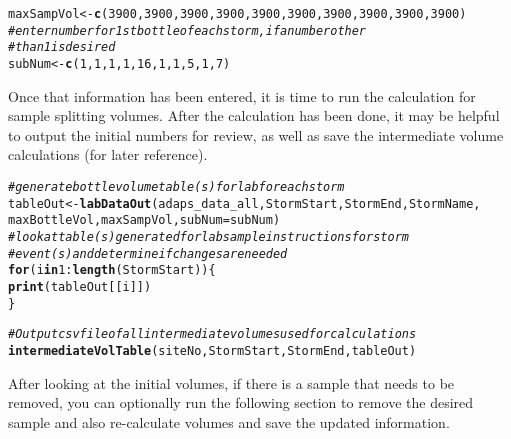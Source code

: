 \documentclass[a4paper,11pt]{article}\usepackage[]{graphicx}\usepackage[]{color}
\makeatletter
\newcommand{\hlnum}[1]{\textcolor[rgb]{0.686,0.059,0.569}{#1}}%
\newcommand{\hlcom}[1]{\textcolor[rgb]{0.678,0.584,0.686}{\textit{#1}}}%
\newcommand{\hlopt}[1]{\textcolor[rgb]{0,0,0}{#1}}%
\newcommand{\hlstd}[1]{\textcolor[rgb]{0.345,0.345,0.345}{#1}}%
\newcommand{\hlkwa}[1]{\textcolor[rgb]{0.161,0.373,0.58}{\textbf{#1}}}%
\newcommand{\hlkwb}[1]{\textcolor[rgb]{0.69,0.353,0.396}{#1}}%
\newcommand{\hlkwc}[1]{\textcolor[rgb]{0.333,0.667,0.333}{#1}}%
\newcommand{\hlkwd}[1]{\textcolor[rgb]{0.737,0.353,0.396}{\textbf{#1}}}%
\newenvironment{kframe}{%
 \def\at@end@of@kframe{}%
 \ifinner\ifhmode%
  \def\at@end@of@kframe{\end{minipage}}%
  \begin{minipage}{\columnwidth}%
 \fi\fi%
 \def\FrameCommand##1{\hskip\@totalleftmargin \hskip-\fboxsep
 \colorbox{shadecolor}{##1}\hskip-\fboxsep
     \hskip-\linewidth \hskip-\@totalleftmargin \hskip\columnwidth}%
 \MakeFramed {\advance\hsize-\width
   \@totalleftmargin\z@ \linewidth\hsize
   \@setminipage}}%
 {\par\unskip\endMakeFramed%
 \at@end@of@kframe}
\newenvironment{knitrout}{}{} %
\makeatother
\begin{document}
\begin{knitrout}
\begin{kframe}
\begin{alltt}
\hlstd{maxSampVol} \hlkwb{<-} \hlkwd{c}\hlstd{(}\hlnum{3900}\hlstd{,}\hlnum{3900}\hlstd{,}\hlnum{3900}\hlstd{,}\hlnum{3900}\hlstd{,}\hlnum{3900}\hlstd{,}\hlnum{3900}\hlstd{,}\hlnum{3900}\hlstd{,}\hlnum{3900}\hlstd{,}\hlnum{3900}\hlstd{,}\hlnum{3900}\hlstd{)}
\hlcom{# enter number for 1st bottle of each storm, if a number other }
\hlcom{# than 1 is desired}
\hlstd{subNum} \hlkwb{<-} \hlkwd{c}\hlstd{(}\hlnum{1}\hlstd{,}\hlnum{1}\hlstd{,}\hlnum{1}\hlstd{,}\hlnum{1}\hlstd{,}\hlnum{16}\hlstd{,}\hlnum{1}\hlstd{,}\hlnum{1}\hlstd{,}\hlnum{5}\hlstd{,}\hlnum{1}\hlstd{,}\hlnum{7}\hlstd{)}
\end{alltt}
\end{kframe}
\end{knitrout}


Once that information has been entered, it is time to run the calculation for sample splitting volumes. After the calculation has been done, it may be helpful to output the initial numbers for review, as well as save the intermediate volume calculations (for later reference).

\begin{knitrout}
\color{fgcolor}\begin{kframe}
\begin{alltt}
\hlcom{# generate bottle volume table(s) for lab for each storm}
\hlstd{tableOut} \hlkwb{<-} \hlkwd{labDataOut}\hlstd{(adaps_data_all,StormStart,StormEnd,StormName,}
                       \hlstd{maxBottleVol,maxSampVol,}\hlkwc{subNum}\hlstd{=subNum)}
\hlcom{# look at table(s) generated for lab sample instructions for storm }
\hlcom{# event(s) and determine if changes are needed}
\hlkwa{for} \hlstd{(i} \hlkwa{in} \hlnum{1}\hlopt{:}\hlkwd{length}\hlstd{(StormStart))\{}
  \hlkwd{print}\hlstd{(tableOut[[i]])}
\hlstd{\}}

\hlcom{#Output csv file of all intermediate volumes used for calculations}
\hlkwd{intermediateVolTable}\hlstd{(siteNo,StormStart,StormEnd,tableOut)}
\end{alltt}
\end{kframe}
\end{knitrout}


After looking at the initial volumes, if there is a sample that needs to be removed, you can optionally run the following section to remove the desired sample and also re-calculate volumes and save the updated information.
\end{document}
